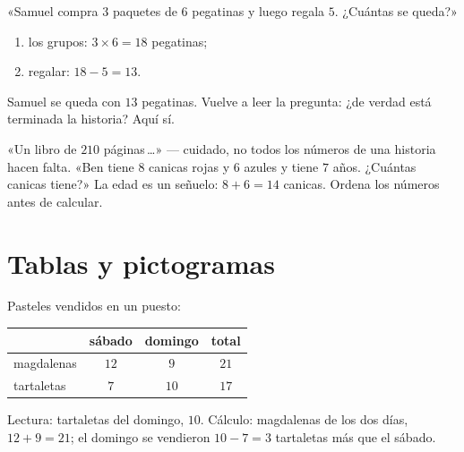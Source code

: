 \begin{example}\label{ex:g2:problems:twostep}
«Samuel compra $3$ paquetes de $6$ pegatinas y luego regala $5$. ¿Cuántas
se queda?»
\begin{enumerate}
  \item los grupos: $3 \times 6 = 18$ pegatinas;
  \item regalar: $18 - 5 = 13$.
\end{enumerate}
Samuel se queda con $13$ pegatinas. Vuelve a leer la pregunta: ¿de verdad está
terminada la historia? Aquí sí.
\end{example}

\begin{example}\label{ex:g2:problems:extra}
«Un libro de $210$ páginas\,\dots» --- cuidado, no todos los números de una
historia hacen falta. «Ben tiene $8$ canicas rojas y $6$ azules y tiene $7$
años. ¿Cuántas canicas tiene?» La edad es un señuelo: $8 + 6 = 14$
canicas. Ordena los números antes de calcular.
\end{example}

\section{Tablas y pictogramas}

\begin{example}\label{ex:g2:problems:table}
Pasteles vendidos en un puesto:
\begin{center}
\renewcommand{\arraystretch}{1.3}
\begin{tabular}{l|ccc}
 & sábado & domingo & total \\
\hline
magdalenas & $12$ & $9$ & $21$ \\
tartaletas & $7$ & $10$ & $17$ \\
\end{tabular}
\end{center}
Lectura: tartaletas del domingo, $10$. Cálculo: magdalenas de los dos días,
$12 + 9 = 21$; el domingo se vendieron $10 - 7 = 3$ tartaletas más que el sábado.
\end{example}

